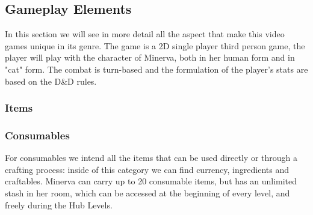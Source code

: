 \subsection{Gameplay Elements}

In this section we will see in more detail all the aspect that make this video games unique in its genre. The game is a 2D single player third person game, the player will play with the character of Minerva, both in her human form and in "cat" form. The combat is turn-based and the formulation of the player's stats are based on the D\&D rules.



\subsubsection{Items}













\pagebreak
\subsubsection{Consumables}
For consumables we intend all the items that can be used directly or through a crafting process: inside of this category we can find currency, ingredients and craftables. Minerva can carry up to 20 consumable items, but has an unlimited stash in her room, which can be accessed at the beginning of every level, and freely during the Hub Levels. \\







